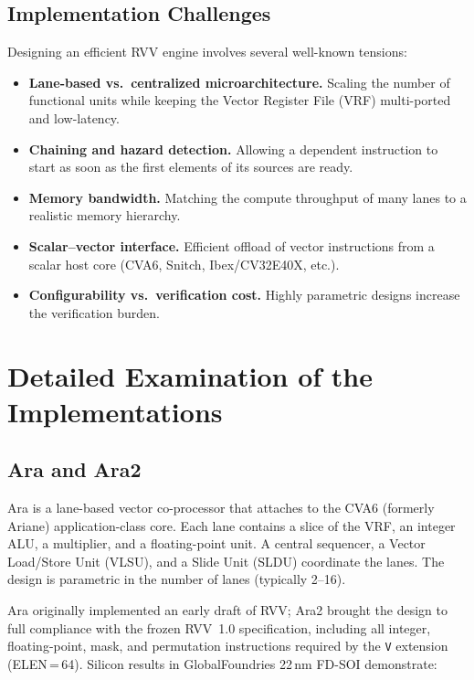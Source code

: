 \documentclass[11pt,a4paper]{article}
\begin{document}
\subsection{Implementation Challenges}

Designing an efficient RVV engine involves several well-known tensions:

\begin{itemize}
  \item \textbf{Lane-based vs.\ centralized microarchitecture.} Scaling the number of functional units while keeping the Vector Register File (VRF) multi-ported and low-latency.
  \item \textbf{Chaining and hazard detection.} Allowing a dependent instruction to start as soon as the first elements of its sources are ready.
  \item \textbf{Memory bandwidth.} Matching the compute throughput of many lanes to a realistic memory hierarchy.
  \item \textbf{Scalar--vector interface.} Efficient offload of vector instructions from a scalar host core (CVA6, Snitch, Ibex/CV32E40X, etc.).
  \item \textbf{Configurability vs.\ verification cost.} Highly parametric designs increase the verification burden.
\end{itemize}

\section{Detailed Examination of the Implementations}

\subsection{Ara and Ara2}

Ara is a lane-based vector co-processor that attaches to the CVA6 (formerly Ariane) application-class core. Each lane contains a slice of the VRF, an integer ALU, a multiplier, and a floating-point unit. A central sequencer, a Vector Load/Store Unit (VLSU), and a Slide Unit (SLDU) coordinate the lanes. The design is parametric in the number of lanes (typically 2--16).

Ara originally implemented an early draft of RVV; Ara2 brought the design to full compliance with the frozen RVV~1.0 specification, including all integer, floating-point, mask, and permutation instructions required by the \texttt{V} extension (ELEN\,=\,64). Silicon results in GlobalFoundries 22\,nm FD-SOI demonstrate:
\end{document}
